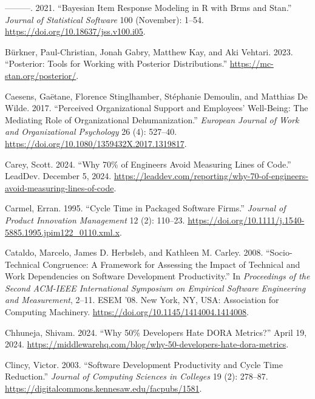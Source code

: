 \documentclass[
]{article}
\newlength{\cslhangindent}
\newenvironment{CSLReferences}[2] %
 {\begin{list}{}{%
  \setlength{\itemindent}{0pt}
  \setlength{\leftmargin}{0pt}
  \setlength{\parsep}{0pt}
  \ifodd #1
   \setlength{\leftmargin}{\cslhangindent}
   \setlength{\itemindent}{-1\cslhangindent}
  \fi
  \setlength{\itemsep}{#2\baselineskip}}}
 {\end{list}}
\begin{document}
\begin{CSLReferences}{1}{0}
---------. 2021. {``Bayesian {Item Response Modeling} in {R} with Brms
and {Stan}.''} \emph{Journal of Statistical Software} 100 (November):
1--54. \url{https://doi.org/10.18637/jss.v100.i05}.

Bürkner, Paul-Christian, Jonah Gabry, Matthew Kay, and Aki Vehtari.
2023. {``Posterior: {Tools} for Working with Posterior Distributions.''}
\url{https://mc-stan.org/posterior/}.

Caesens, Gaëtane, Florence Stinglhamber, Stéphanie Demoulin, and
Matthias De Wilde. 2017. {``Perceived Organizational Support and
Employees' Well-Being: The Mediating Role of Organizational
Dehumanization.''} \emph{European Journal of Work and Organizational
Psychology} 26 (4): 527--40.
\url{https://doi.org/10.1080/1359432X.2017.1319817}.

Carey, Scott. 2024. {``Why 70\% of Engineers Avoid Measuring Lines of
Code.''} LeadDev. December 5, 2024.
\url{https://leaddev.com/reporting/why-70-of-engineers-avoid-measuring-lines-of-code}.

Carmel, Erran. 1995. {``Cycle {Time} in {Packaged Software Firms}.''}
\emph{Journal of Product Innovation Management} 12 (2): 110--23.
\url{https://doi.org/10.1111/j.1540-5885.1995.jpim122_0110.xml.x}.

Cataldo, Marcelo, James D. Herbsleb, and Kathleen M. Carley. 2008.
{``Socio-Technical Congruence: A Framework for Assessing the Impact of
Technical and Work Dependencies on Software Development Productivity.''}
In \emph{Proceedings of the {Second ACM-IEEE} International Symposium on
{Empirical} Software Engineering and Measurement}, 2--11. {ESEM} '08.
New York, NY, USA: Association for Computing Machinery.
\url{https://doi.org/10.1145/1414004.1414008}.

Chhuneja, Shivam. 2024. {``Why 50\% {Developers Hate DORA Metrics}?''}
April 19, 2024.
\url{https://middlewarehq.com/blog/why-50-developers-hate-dora-metrics}.

Clincy, Victor. 2003. {``Software {Development Productivity} and {Cycle
Time Reduction}.''} \emph{Journal of Computing Sciences in Colleges} 19
(2): 278--87. \url{https://digitalcommons.kennesaw.edu/facpubs/1581}.


\end{CSLReferences}
\end{document}
